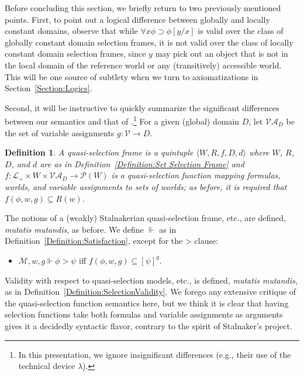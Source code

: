 \documentclass[12pt]{article}
\newtheorem{definition}{Definition}
\newcommand{\tup}[1]{\langle #1 \rangle}
\newcommand{\would}{\mathbin{>}}
\newcommand{\then}{\mathbin{\supset}}
\begin{document}

Before concluding this section, we briefly return to two previously mentioned points. First, to point out a logical difference between globally and locally constant domains, observe that while $\forall x\phi \then \phi[y/x]$ is valid over the class of globally constant domain selection frames, it is not valid over the class of locally constant domain selection frames, since $y$ may pick out an object that is not in the local domain of the reference world or any (transitively) accessible world. This will be one source of subtlety when we turn to axiomatizations in Section~\ref{Section:Logics}.

Second, it will be instructive to quickly summarize the significant differences between our semantics and that of \cite{StalnakerThomason1970}.\footnote{In this presentation, we ignore insignificant differences (e.g., their use of the technical device $\lambda$).} For a given (global) domain $D$, let $\mathcal{VA}_D$ be the set of variable assignments $g\colon \mathcal{V} \rightarrow D$. 

\begin{definition}
\label{Definition:Quasi Selection Frame}
    A \emph{quasi-selection frame} is a quintuple $\tup{W,R,f,D,d}$ where $W$, $R$, $D$, and $d$ are as in Definition~\ref{Definition:Set Selection Frame} and $f\colon \mathcal{L}_{=} \times W \times \mathcal{VA}_D \rightarrow \mathcal{P}(W)$ is a \emph{quasi-selection function} mapping formulas, worlds, and variable assignments to sets of worlds; as before, it is required that $f(\phi,w,g) \subseteq R(w)$. 
\end{definition}

The notions of a (weakly) Stalnakerian quasi-selection frame, etc., are defined, \textit{mutatis mutandis}, as before. We define $\Vdash$ as in Definition~\ref{Definition:Satisfaction}, except for the $\would$ clause:
\begin{itemize}
    \item[$\would$.] $\mathcal{M},w,g \Vdash \phi \would \psi$ iff $f(\phi,w,g) \subseteq [\psi]^g$.
\end{itemize}
Validity with respect to quasi-selection models, etc., is defined, \textit{mutatis mutandis}, as in Definition~\ref{Definition:SelectionValidity}. 
We forego any extensive critique of the quasi-selection function semantics here, but we think it is clear that having selection functions take both formulas and variable assignments as arguments gives it a decidedly syntactic flavor, contrary to the spirit of Stalnaker's project. 
\end{document}
